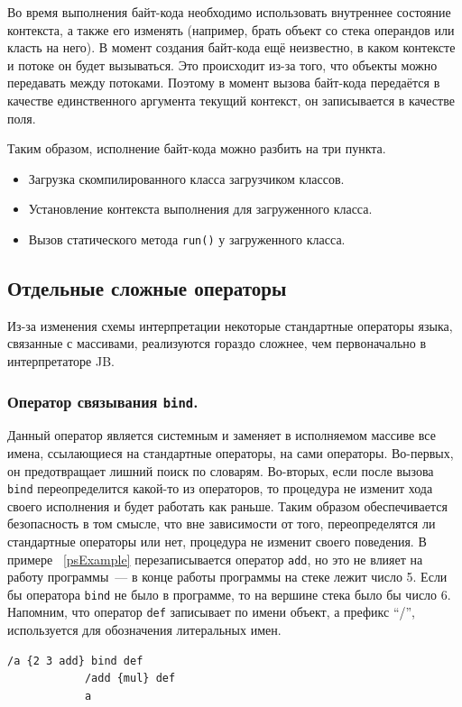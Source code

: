 	Во время выполнения байт-кода необходимо использовать внутреннее состояние контекста, а также его изменять (например, брать объект со стека операндов или класть на него). В момент создания байт-кода ещё неизвестно, в каком контексте и потоке он будет вызываться. Это происходит из-за того, что объекты можно передавать между потоками. Поэтому в момент вызова байт-кода передаётся в качестве единственного аргумента текущий контекст, он записывается в качестве поля.
	
	Таким образом, исполнение байт-кода можно разбить на три пункта.
	\begin{itemize}
		\item Загрузка скомпилированного класса загрузчиком классов.
		\item Установление контекста выполнения для загруженного класса.
		\item Вызов статического метода \texttt{run()} у загруженного класса.
	\end{itemize}
	\subsection{Отдельные сложные операторы}
	Из-за изменения схемы интерпретации некоторые стандартные операторы языка, связанные с массивами, реализуются гораздо сложнее, чем первоначально в интерпретаторе JB. 
	\subsubsection*{Оператор связывания \texttt{bind}.}
	Данный оператор является системным и заменяет в исполняемом массиве все имена, ссылающиеся на стандартные операторы, на сами операторы.	Во-первых, он предотвращает лишний поиск по словарям. Во-вторых, если после вызова \texttt{bind} переопределится какой-то из операторов, то процедура не изменит хода своего исполнения и будет работать как раньше. Таким образом обеспечивается безопасность в том смысле, что вне зависимости от того, переопределятся ли стандартные операторы или нет, процедура не изменит своего поведения. В примере ~\ref{psExample} перезаписывается оператор \texttt{add}, но это не влияет на работу программы~---  в конце работы программы на стеке лежит число 5. Если бы оператора \texttt{bind} не было в программе, то на вершине стека было бы число 6. Напомним, что оператор \texttt{def} записывает по имени объект, а префикс ``/'',  используется для обозначения литеральных имен.  
		\begin{lstlisting}[float, label=psExample,caption=пример на PostScript на оператор \texttt{bind},captionpos=b language = PostScript]
			/a {2 3 add} bind def
			/add {mul} def
			a
		\end{lstlisting}
	

